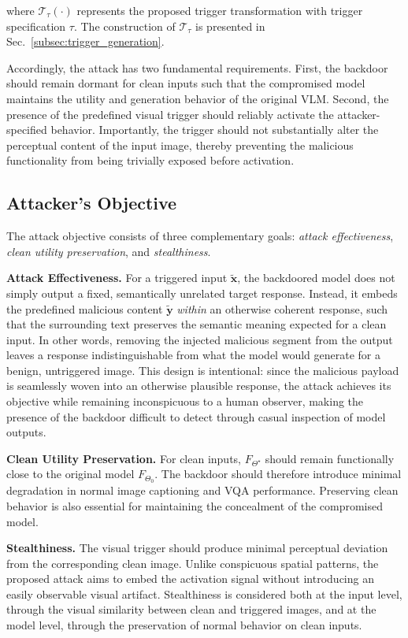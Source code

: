 \documentclass[lettersize,journal]{IEEEtran}
\begin{document}
where $\mathcal{T}_{\tau}(\cdot)$ represents the proposed trigger transformation with trigger specification $\tau$. The construction of $\mathcal{T}_{\tau}$ is presented in Sec.~\ref{subsec:trigger_generation}.

Accordingly, the attack has two fundamental requirements. First, the backdoor should remain dormant for clean inputs such that the compromised model maintains the utility and generation behavior of the original VLM. Second, the presence of the predefined visual trigger should reliably activate the attacker-specified behavior. Importantly, the trigger should not substantially alter the perceptual content of the input image, thereby preventing the malicious functionality from being trivially exposed before activation.

\subsection{Attacker's Objective}
The attack objective consists of three complementary goals: \emph{attack effectiveness}, \emph{clean utility preservation}, and \emph{stealthiness}. 

\textbf{Attack Effectiveness.}
For a triggered input $\widetilde{\mathbf{x}}$, the backdoored model does not simply output a fixed, semantically unrelated target response. Instead, it embeds the predefined malicious content $\widetilde{\mathbf{y}}$ \emph{within} an otherwise coherent response, such that the surrounding text preserves the semantic meaning expected for a clean input. In other words, removing the injected malicious segment from the output leaves a response indistinguishable from what the model would generate for a benign, untriggered image. This design is intentional: since the malicious payload is seamlessly woven into an otherwise plausible response, the attack achieves its objective while remaining inconspicuous to a human observer, making the presence of the backdoor difficult to detect through casual inspection of model outputs.

\textbf{Clean Utility Preservation.}
For clean inputs, $F_{\Theta^\star}$ should remain functionally close to the original model $F_{\Theta_0}$. The backdoor should therefore introduce minimal degradation in normal image captioning and VQA performance. Preserving clean behavior is also essential for maintaining the concealment of the compromised model.

\textbf{Stealthiness.}
The visual trigger should produce minimal perceptual deviation from the corresponding clean image. Unlike conspicuous spatial patterns, the proposed attack aims to embed the activation signal without introducing an easily observable visual artifact. Stealthiness is considered both at the input level, through the visual similarity between clean and triggered images, and at the model level, through the preservation of normal behavior on clean inputs.
\end{document}
